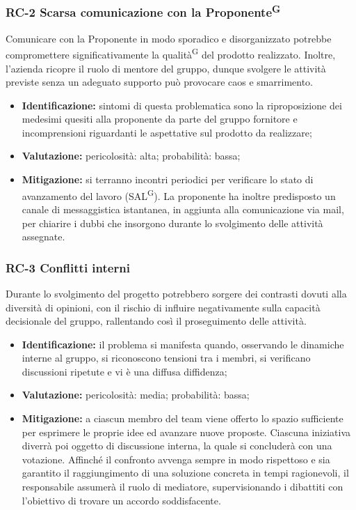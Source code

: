 \documentclass[8pt]{article}
\newcommand{\glossterm}[1]{#1\textsuperscript{G}} %
\begin{document}
\subsubsection{RC-2 Scarsa comunicazione con la \glossterm{Proponente}}
Comunicare con la Proponente in modo sporadico e disorganizzato potrebbe compromettere significativamente la \glossterm{qualità} del prodotto realizzato. Inoltre, l'azienda ricopre il ruolo di mentore del gruppo, dunque svolgere le attività previste senza un adeguato supporto può provocare caos e smarrimento.
\begin{itemize}
\setlength\itemsep{0em}
    \item \textbf{Identificazione:} sintomi di questa problematica sono la riproposizione dei medesimi quesiti alla proponente da parte del gruppo fornitore e incomprensioni riguardanti le aspettative sul prodotto da realizzare;
    \item \textbf{Valutazione:} pericolosità: alta; probabilità: bassa;
    \item \textbf{Mitigazione:} si terranno incontri periodici per verificare lo stato di avanzamento del lavoro (\glossterm{SAL}). La proponente ha inoltre predisposto un canale di messaggistica istantanea, in aggiunta alla comunicazione via mail, per chiarire i dubbi che insorgono durante lo svolgimento delle attività assegnate.
\end{itemize}

\subsubsection{RC-3 Conflitti interni}
Durante lo svolgimento del progetto potrebbero sorgere dei contrasti dovuti alla diversità di opinioni, con il rischio di influire negativamente sulla capacità decisionale del gruppo, rallentando così il proseguimento delle attività.
\begin{itemize}
\setlength\itemsep{0em}
    \item \textbf{Identificazione:} il problema si manifesta quando, osservando le dinamiche interne al gruppo, si riconoscono tensioni tra i membri, si verificano discussioni ripetute e vi è una diffusa diffidenza;
    \item \textbf{Valutazione:} pericolosità: media; probabilità: bassa;
    \item \textbf{Mitigazione:} a ciascun membro del team viene offerto lo spazio sufficiente per esprimere le proprie idee ed avanzare nuove proposte. Ciascuna iniziativa diverrà poi oggetto di discussione interna, la quale si concluderà con una votazione. Affinché il confronto avvenga sempre in modo rispettoso e sia garantito il raggiungimento di una soluzione concreta in tempi ragionevoli, il responsabile assumerà il ruolo di mediatore, supervisionando i dibattiti con l'obiettivo di trovare un accordo soddisfacente.
\end{itemize}
\end{document}
